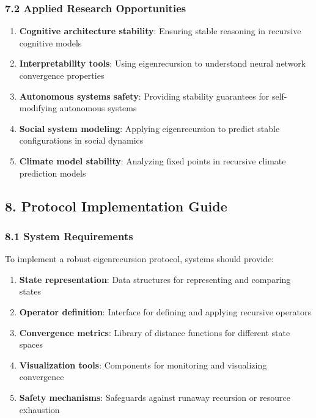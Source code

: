 \documentclass[
]{article}
\providecommand{\tightlist}{%
  \setlength{\itemsep}{0pt}\setlength{\parskip}{0pt}}
\begin{document}
\subsubsection{7.2 Applied Research
Opportunities}\label{applied-research-opportunities}

\begin{enumerate}
\def\labelenumi{\arabic{enumi}.}
\tightlist
\item
  \textbf{Cognitive architecture stability}: Ensuring stable reasoning
  in recursive cognitive models
\item
  \textbf{Interpretability tools}: Using eigenrecursion to understand
  neural network convergence properties
\item
  \textbf{Autonomous systems safety}: Providing stability guarantees for
  self-modifying autonomous systems
\item
  \textbf{Social system modeling}: Applying eigenrecursion to predict
  stable configurations in social dynamics
\item
  \textbf{Climate model stability}: Analyzing fixed points in recursive
  climate prediction models
\end{enumerate}

\subsection{8. Protocol Implementation
Guide}\label{protocol-implementation-guide}

\subsubsection{8.1 System Requirements}\label{system-requirements}

To implement a robust eigenrecursion protocol, systems should provide:

\begin{enumerate}
\def\labelenumi{\arabic{enumi}.}
\tightlist
\item
  \textbf{State representation}: Data structures for representing and
  comparing states
\item
  \textbf{Operator definition}: Interface for defining and applying
  recursive operators
\item
  \textbf{Convergence metrics}: Library of distance functions for
  different state spaces
\item
  \textbf{Visualization tools}: Components for monitoring and
  visualizing convergence
\item
  \textbf{Safety mechanisms}: Safeguards against runaway recursion or
  resource exhaustion
\end{enumerate}
\end{document}
